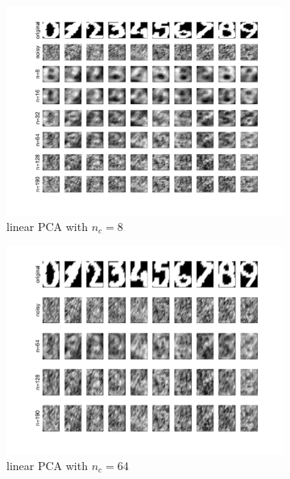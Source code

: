 \documentclass[a4paper, 11pt, one column]{article}
\begin{document}
\begin{figure}[H]
        \begin{subfigure}{0.45\linewidth}
            \includegraphics[width=\linewidth]{images/linpca_8nc.png}
            \caption{linear PCA with $n_c = 8$}
        \end{subfigure}
        \begin{subfigure}{0.45\linewidth}
            \includegraphics[width=\linewidth]{images/linpca_64nc.png}
            \caption{linear PCA with $n_c = 64$}
        \end{subfigure}
        \centering
        \begin{subfigure}{0.45\linewidth}

\end{subfigure}
\end{figure}
\end{document}
